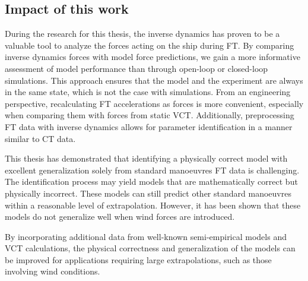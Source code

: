 \subsection*{Impact of this work}
During the research for this thesis, the inverse dynamics has proven to be a valuable tool to analyze the forces acting on the ship during FT. By comparing inverse dynamics forces with model force predictions, we gain a more informative assessment of model performance than through open-loop or closed-loop simulations. This approach ensures that the model and the experiment are always in the same state, which is not the case with simulations. From an engineering perspective, recalculating FT accelerations as forces is more convenient, especially when comparing them with forces from static VCT. Additionally, preprocessing FT data with inverse dynamics allows for parameter identification in a manner similar to CT data.

This thesis has demonstrated that identifying a physically correct model with excellent generalization solely from standard manoeuvres FT data is challenging. The identification process may yield models that are mathematically correct but physically incorrect. These models can still predict other standard manoeuvres within a reasonable level of extrapolation. However, it has been shown that these models do not generalize well when wind forces are introduced.

By incorporating additional data from well-known semi-empirical models and VCT calculations, the physical correctness and generalization of the models can be improved for applications requiring large extrapolations, such as those involving wind conditions. 